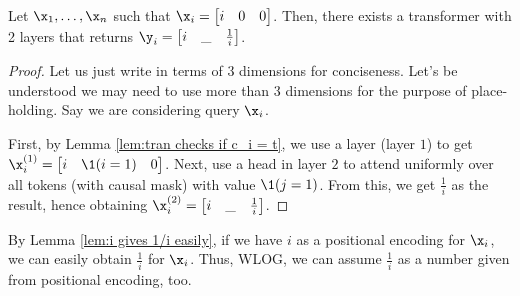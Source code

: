 \begin{lemma} \label{lem:i gives 1/i easily}
    Let $\x_1, \dots, \x_n$ such that $\x_i = \begin{bmatrix}
        i &0 &0
    \end{bmatrix}$. Then, there exists a transformer with 2 layers that returns $\y_i = \begin{bmatrix}
        i &\_ &\frac{1}{i}
    \end{bmatrix}$. 
\end{lemma}

\begin{proof} 
    Let us just write in terms of $3$ dimensions for conciseness. Let's be understood we may need to use more than $3$ dimensions for the purpose of place-holding. Say we are considering query $\x_i$.
    
    First, by Lemma \ref{lem:tran checks if c_i = t}, we use a layer (layer $1$) to get $\x_i^{(1)} = \begin{bmatrix}
        i &\1(i=1) &0
    \end{bmatrix}$. 
Next, use a head in layer $2$ to attend uniformly over all tokens (with causal mask) with value $\1(j = 1)$. From this, we get $\frac{1}{i}$ as the result, hence obtaining $\x_i^{(2)} = \begin{bmatrix}
        i &\_ &\frac{1}{i}
    \end{bmatrix}$.  
\end{proof}


\begin{remark}
    By Lemma \ref{lem:i gives 1/i easily}, if we have $i$ as a positional encoding for $\x_i$, we can easily obtain $\frac{1}{i}$ for $\x_i$. Thus, WLOG, we can assume $\frac{1}{i}$ as a number given from positional encoding, too.
\end{remark}








